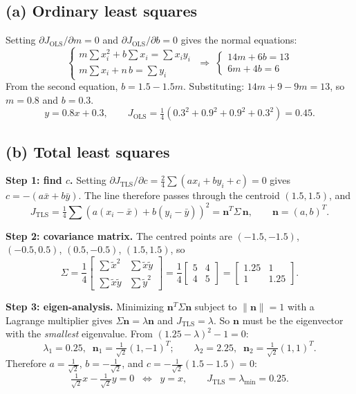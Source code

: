 \documentclass[11pt]{article}
\begin{document}
\subsection*{(a) Ordinary least squares}
Setting $\partial J_{\text{OLS}}/\partial m=0$ and $\partial J_{\text{OLS}}/\partial b=0$ gives the normal equations:
\[
\begin{cases}
m\sum x_i^2 + b\sum x_i = \sum x_iy_i\\
m\sum x_i + n\,b = \sum y_i
\end{cases}
\;\Rightarrow\;
\begin{cases}
14m + 6b = 13\\
6m + 4b = 6
\end{cases}
\]
From the second equation, $b = 1.5-1.5m$. Substituting: $14m + 9 - 9m = 13$, so $m = 0.8$ and $b=0.3$.
\[
\boxed{y = 0.8x + 0.3}, \qquad J_{\text{OLS}} = \tfrac14(0.3^2+0.9^2+0.9^2+0.3^2) = 0.45.
\]

\subsection*{(b) Total least squares}
\textbf{Step 1: find $c$.} Setting $\partial J_{\text{TLS}}/\partial c = \tfrac24\sum(ax_i+by_i+c)=0$ gives $c=-(a\bar x+b\bar y)$. The line therefore passes through the centroid $(1.5,1.5)$, and
\[
J_{\text{TLS}} = \tfrac14\sum\left(a(x_i-\bar x)+b(y_i-\bar y)\right)^2 = \mathbf n^T\Sigma\,\mathbf n,\qquad \mathbf n=(a,b)^T.
\]

\textbf{Step 2: covariance matrix.} The centred points are $(-1.5,-1.5)$, $(-0.5,0.5)$, $(0.5,-0.5)$, $(1.5,1.5)$, so
\[
\Sigma = \frac14\begin{bmatrix}\sum\tilde x^2 & \sum\tilde x\tilde y\\ \sum\tilde x\tilde y & \sum\tilde y^2\end{bmatrix}
= \frac14\begin{bmatrix}5 & 4\\ 4 & 5\end{bmatrix}
= \begin{bmatrix}1.25 & 1\\ 1 & 1.25\end{bmatrix}.
\]

\textbf{Step 3: eigen-analysis.} Minimizing $\mathbf n^T\Sigma\mathbf n$ subject to $\|\mathbf n\|=1$ with a Lagrange multiplier gives $\Sigma\mathbf n=\lambda\mathbf n$ and $J_{\text{TLS}}=\lambda$. So $\mathbf n$ must be the eigenvector with the \emph{smallest} eigenvalue. From $(1.25-\lambda)^2-1=0$:
\[
\lambda_1 = 0.25,\;\; \mathbf n_1=\tfrac1{\sqrt2}(1,-1)^T; \qquad \lambda_2 = 2.25,\;\; \mathbf n_2=\tfrac1{\sqrt2}(1,1)^T.
\]
Therefore $a=\tfrac1{\sqrt2}$, $b=-\tfrac1{\sqrt2}$, and $c=-\tfrac1{\sqrt2}(1.5-1.5)=0$:
\[
\boxed{\tfrac1{\sqrt2}x-\tfrac1{\sqrt2}y = 0 \;\;\Leftrightarrow\;\; y=x}, \qquad J_{\text{TLS}}=\lambda_{\min}=0.25.
\]
\end{document}
